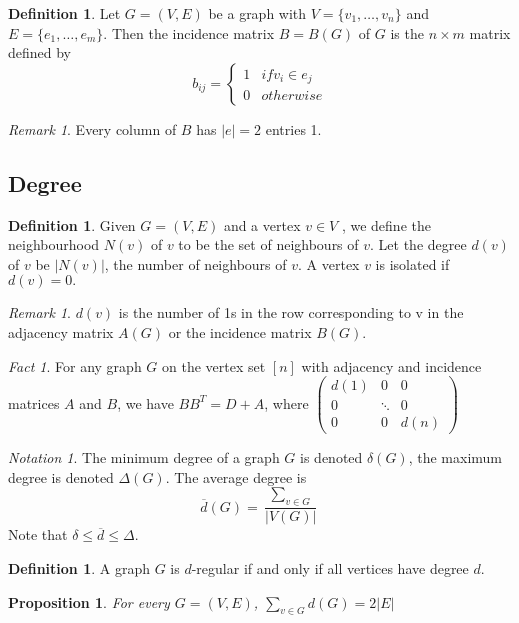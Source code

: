 \documentclass[10pt, fleqn, a4paper, landscape]{article}
\theoremstyle{plain} %
\newtheorem{pro}[thm]{Proposition}
\theoremstyle{remark} %
\newtheorem{rem}[thm]{Remark}
\newtheorem{nota}[thm]{Notation}
\newtheorem{fact}{Fact}
\theoremstyle{definition} %
\newtheorem{defi}[thm]{Definition}
\begin{document}
\begin{multicols}{3}
\begin{tiny}
\begin{defi}
Let $G = (V,E)$ be a graph with $V = \{v_1, \dots , v_n\}$ and $E = \{e_1, \dots , e_m\}$. Then the incidence matrix $B = B(G)$ of $G$ is the $n\times m$ matrix defined by \[b_{ij}=\begin{cases}1 & if v_i\in e_j\\ 0 & otherwise\end{cases}\]
\end{defi}
\addtocounter{thm}{1}
\begin{rem}
Every column of $B$ has $|e| = 2$ entries 1.
\end{rem}

\subsection{Degree}

\begin{defi}
Given $G = (V,E)$ and a vertex $v \in V$ , we define the neighbourhood $N(v)$ of $v$ to
be the set of neighbours of $v$. Let the degree $d(v)$ of $v$ be $|N(v)|$, the number of neighbours of $v$. A vertex $v$ is isolated if $d(v) = 0.$
\end{defi}
\begin{rem}
$d(v)$ is the number of 1s in the row corresponding to v in the adjacency matrix $A(G)$ or the incidence matrix $B(G)$.
\end{rem} 
\addtocounter{thm}{1}
\begin{fact}
For any graph $G$ on the vertex set $[n]$ with adjacency and incidence matrices $A$ and $B$, we have $BB^T = D + A$, where
$
\begin{pmatrix}
d(1) & 0 & 0  \\
0 & \ddots & 0  \\
0 & 0 & d(n)  
\end{pmatrix}
$  
\end{fact}

\begin{nota}
The minimum degree of a graph $G$ is denoted $\delta(G)$, the maximum degree is denoted $\Delta(G)$. The average degree is \[\overline{d}(G) =\frac{\sum_{v\in G}}{|V(G)|}\] Note that $\delta\le\overline{d}\le\Delta$.
\end{nota}

\begin{defi}
A graph $G$ is $d$-regular if and only if all vertices have degree $d$.
\end{defi}
\addtocounter{thm}{1}
\begin{pro}
For every $G = (V,E)$, $\sum_{v\in G}d(G)=2|E|$
\end{pro}


\end{tiny}
\end{multicols}
\end{document}
